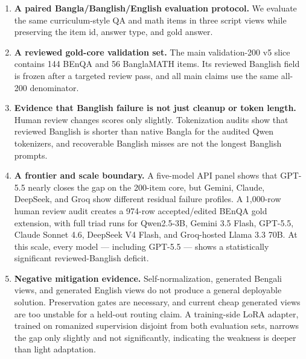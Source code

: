 \begin{enumerate}
\item \textbf{A paired Bangla/Banglish/English evaluation protocol.} We evaluate the
same curriculum-style QA and math items in three script views while preserving the item id, answer type, and gold answer.

\item \textbf{A reviewed gold-core validation set.} The main validation-200 v5 slice
contains 144 BEnQA and 56 BanglaMATH items. Its reviewed Banglish field is frozen after a targeted review pass, and all main claims use the same all-200 denominator.

\item \textbf{Evidence that Banglish failure is not just cleanup or token length.} Human
review changes scores only slightly. Tokenization audits show that reviewed Banglish is shorter than native Bangla for the audited Qwen tokenizers, and recoverable Banglish misses are not the longest Banglish prompts.

\item \textbf{A frontier and scale boundary.} A five-model API panel shows that GPT-5.5
nearly closes the gap on the 200-item core, but Gemini, Claude, DeepSeek, and Groq show different residual failure profiles. A 1,000-row human review audit creates a 974-row accepted/edited BEnQA gold extension, with full triad runs for Qwen2.5-3B, Gemini 3.5 Flash, GPT-5.5, Claude Sonnet 4.6, DeepSeek V4 Flash, and Groq-hosted Llama 3.3 70B. At this scale, every model --- including GPT-5.5 --- shows a statistically significant reviewed-Banglish deficit.

\item \textbf{Negative mitigation evidence.} Self-normalization, generated Bengali
views, and generated English views do not produce a general deployable solution. Preservation gates are necessary, and current cheap generated views are too unstable for a held-out routing claim. A training-side LoRA adapter, trained on romanized supervision disjoint from both evaluation sets, narrows the gap only slightly and not significantly, indicating the weakness is deeper than light adaptation.

\end{enumerate}

\endinput
